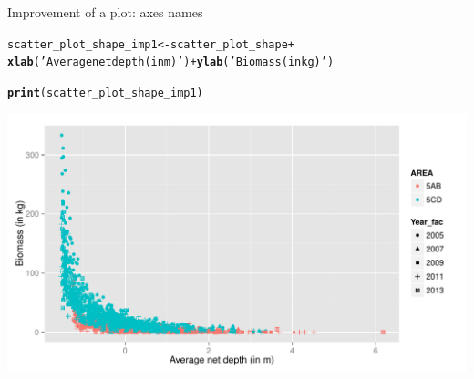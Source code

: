 \documentclass{beamer}\usepackage[]{graphicx}\usepackage[]{color}
\makeatletter
\newcommand{\hlstr}[1]{\textcolor[rgb]{0.192,0.494,0.8}{#1}}%
\newcommand{\hlopt}[1]{\textcolor[rgb]{0,0,0}{#1}}%
\newcommand{\hlstd}[1]{\textcolor[rgb]{0.345,0.345,0.345}{#1}}%
\newcommand{\hlkwb}[1]{\textcolor[rgb]{0.69,0.353,0.396}{#1}}%
\newcommand{\hlkwd}[1]{\textcolor[rgb]{0.737,0.353,0.396}{\textbf{#1}}}%
\newenvironment{kframe}{%
 \def\at@end@of@kframe{}%
 \ifinner\ifhmode%
  \def\at@end@of@kframe{\end{minipage}}%
  \begin{minipage}{\columnwidth}%
 \fi\fi%
 \def\FrameCommand##1{\hskip\@totalleftmargin \hskip-\fboxsep
 \colorbox{shadecolor}{##1}\hskip-\fboxsep
     \hskip-\linewidth \hskip-\@totalleftmargin \hskip\columnwidth}%
 \MakeFramed {\advance\hsize-\width
   \@totalleftmargin\z@ \linewidth\hsize
   \@setminipage}}%
 {\par\unskip\endMakeFramed%
 \at@end@of@kframe}
\newenvironment{knitrout}{}{} %
\makeatother
\begin{document}
\begin{frame}[fragile]{Improvement of a plot: axes names}
\begin{knitrout}\footnotesize
{}\color{fgcolor}\begin{kframe}
\begin{alltt}
  \hlstd{scatter_plot_shape_imp1} \hlkwb{<-} \hlstd{scatter_plot_shape} \hlopt{+}
  \hlkwd{xlab}\hlstd{(}\hlstr{'Average net depth (in m)'}\hlstd{)} \hlopt{+} \hlkwd{ylab}\hlstd{(}\hlstr{'Biomass (in kg)'}\hlstd{)}

  \hlkwd{print}\hlstd{(scatter_plot_shape_imp1)}
\end{alltt}
\end{kframe}

{\centering \includegraphics[width=.9\linewidth]{figure/scatter_plot_shape_imp1-1} 

}



\end{knitrout}
\end{frame}
\end{document}
